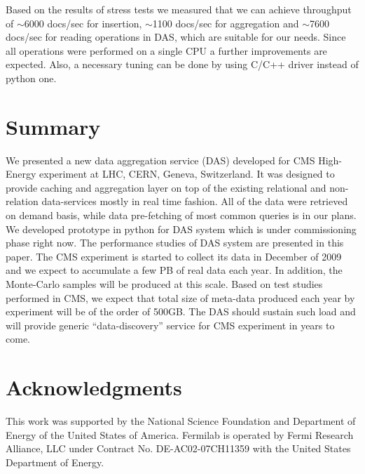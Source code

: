 \documentclass[1p,times]{elsarticle}
\begin{document}
Based on the results of stress tests we measured that we can achieve throughput of
$\sim$6000 docs/sec for insertion, $\sim$1100 docs/sec for aggregation and 
$\sim$7600 docs/sec for 
reading operations in DAS, which are suitable for our needs. Since all 
operations were performed on a single CPU a further improvements are expected. 
Also, a necessary tuning can be done by using C/C++ driver instead of python one.

\section{Summary}
We presented a new data aggregation service (DAS) developed for CMS High-Energy experiment
at LHC, CERN, Geneva, Switzerland. It was designed to provide caching and
aggregation layer on top of the existing relational and non-relation data-services
mostly in real time fashion. All of the data were retrieved on demand basis,
while data pre-fetching of most common queries is in our plans. We developed
prototype in python for DAS system which is under commissioning phase right now.
The performance studies of DAS system are presented in this paper. 
The CMS experiment is started to collect its data in December of 2009 and 
we expect to accumulate a few PB of real data each year. 
In addition, the Monte-Carlo samples will be produced at this scale.
Based on test studies performed in CMS, we expect that total size of
meta-data produced each year by experiment will be of the order of
500GB. The DAS should sustain such load and will provide generic 
``data-discovery'' service for CMS experiment in years to come.

\section{Acknowledgments}

This work was supported by the National Science Foundation and 
Department of Energy of the United States of America. 
Fermilab is operated by Fermi Research Alliance, LLC under Contract
No. DE-AC02-07CH11359 with the United States Department of Energy.



%
%
\end{document}
